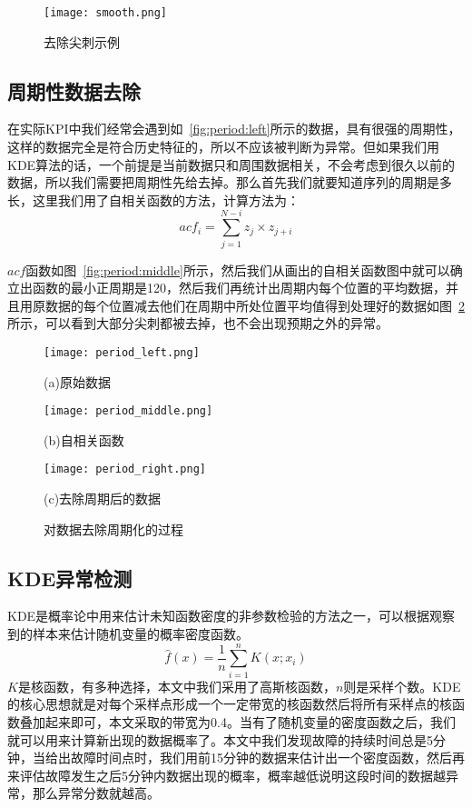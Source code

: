 \begin{figure}[htbp]
  \centering
  \texttt{[image: smooth.png]}
  \caption{去除尖刺示例}
  \label{fig:smooth}
\end{figure}
\subsection{周期性数据去除}

在实际KPI中我们经常会遇到如~\ref{fig:period:left}所示的数据，具有很强的周期性，
这样的数据完全是符合历史特征的，所以不应该被判断为异常。但如果我们用KDE算法的话，一个前提是当前数据只和周围数据相关，不会考虑到很久以前的数据，所以我们需要把周期性先给去掉。那么首先我们就要知道序列的周期是多长，这里我们用了自相关函数的方法，计算方法为：
\begin{equation}
  acf_i = \sum_{j=1}^{N-i}z_j\times z_{j+i}
\end{equation}

$acf$函数如图~\ref{fig:period:middle}所示，然后我们从画出的自相关函数图中就可以确立出函数的最小正周期是120，然后我们再统计出周期内每个位置的平均数据，并且用原数据的每个位置减去他们在周期中所处位置平均值得到处理好的数据如图~\ref{fig:period:right}所示，可以看到大部分尖刺都被去掉，也不会出现预期之外的异常。
\begin{figure}[htbp]
    \begin{minipage}[t]{0.33\linewidth}
    \centering
    \texttt{[image: period\_left.png]}
    \caption*{(a)原始数据}
    \label{fig:period:left}
    \end{minipage}
    \begin{minipage}[t]{0.33\linewidth}
    \centering
    \texttt{[image: period\_middle.png]}
    \caption*{(b)自相关函数}
    \label{fig:period:middle}
    \end{minipage}
    \begin{minipage}[t]{0.33\linewidth}
      \centering
      \texttt{[image: period\_right.png]}
      \caption*{(c)去除周期后的数据}
      \label{fig:period:right}
      \end{minipage}
    \caption{对数据去除周期化的过程}
\end{figure}
\subsection{KDE异常检测}
KDE是概率论中用来估计未知函数密度的非参数检验的方法之一，可以根据观察到的样本来估计随机变量的概率密度函数。
\begin{equation}
\hat{f}(x) = \frac{1}{n}\sum_{i=1}^nK(x;x_i)
\end{equation}
$K$是核函数，有多种选择，本文中我们采用了高斯核函数，$n$则是采样个数。KDE的核心思想就是对每个采样点形成一个一定带宽的核函数然后将所有采样点的核函数叠加起来即可，本文采取的带宽为0.4。当有了随机变量的密度函数之后，我们就可以用来计算新出现的数据概率了。本文中我们发现故障的持续时间总是5分钟，当给出故障时间点时，我们用前15分钟的数据来估计出一个密度函数，然后再来评估故障发生之后5分钟内数据出现的概率，概率越低说明这段时间的数据越异常，那么异常分数就越高。
